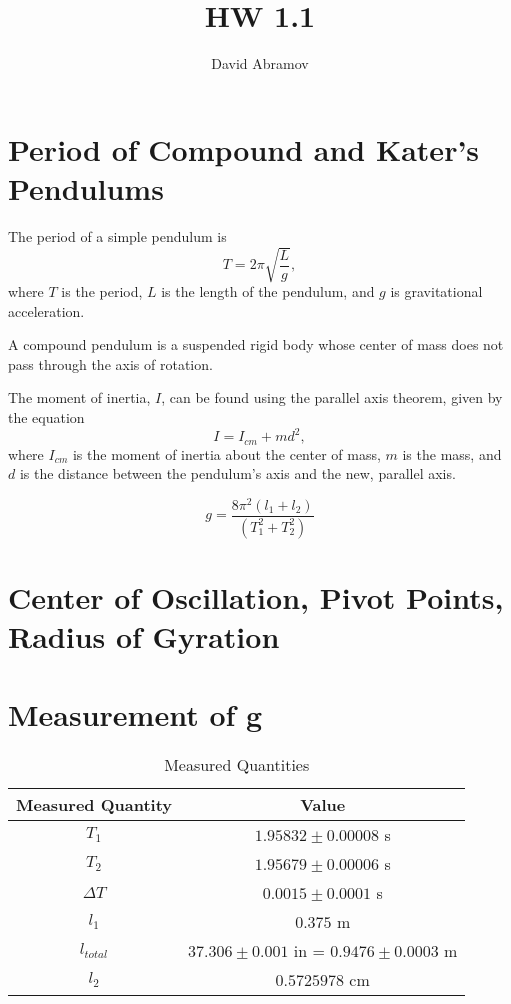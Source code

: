 \documentclass[12pt, oneside]{article}   	%
\title{HW 1.1}
\author{David Abramov}
\begin{document}
\maketitle

\section{Period of Compound and Kater's Pendulums}

The period of a simple pendulum is
\begin{equation}
T=2\pi\sqrt{\frac{L}{g}},
\end{equation}
where $T$ is the period, $L$ is the length of the pendulum, and $g$ is gravitational acceleration.

A compound pendulum is a suspended rigid body whose center of mass does not pass through the axis of rotation. 

The moment of inertia, $I$, can be found using the parallel axis theorem, given by the equation
\begin{equation}
I=I_{cm}+md^2,
\end{equation}
where $I_{cm}$ is the moment of inertia about the center of mass, $m$ is the mass, and $d$ is the distance between the pendulum's axis and the new, parallel axis.


\begin{equation}
g = \frac{8\pi^2(l_{1}+l_{2})}{(T_{1}^2+T_{2}^2)}
\end{equation}

\section{Center of Oscillation, Pivot Points, Radius of Gyration}

\section{Measurement of g}

\begin{table}[h!]
\centering
\begin{tabular}{||c | c||} 
 \hline
 Measured Quantity & Value \\ [0.5ex] 
 \hline\hline
 $T_{1} $ & $1.95832 \pm 0.00008$ s \\ 
 $T_{2}$ &  $1.95679 \pm 0.00006$ s \\
 $\Delta T$ & $0.0015 \pm 0.0001$ s\\ 
 $l_{1}$ & $0.375$ m \\ 
 $l_{total}$ & $37.306 \pm 0.001$ in = $0.9476 \pm 0.0003$ m\\ 
 $l_{2}$ & $0.5725978$ cm\\[1ex]
 
 \hline
\end{tabular}
\caption{Measured Quantities}
\label{table:1}
\end{table}
\end{document}
